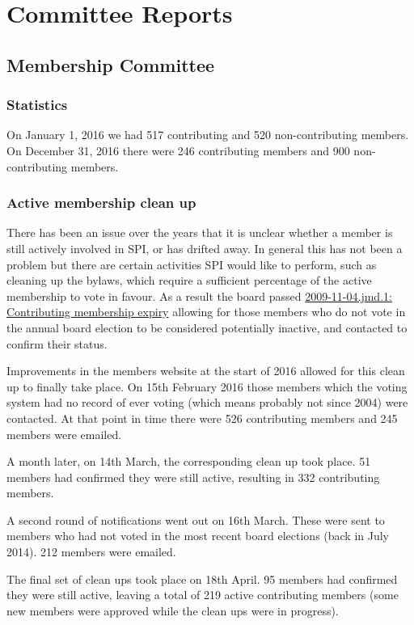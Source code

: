 \documentclass[letterpaper]{report}
\begin{document}
\chapter{Committee Reports}
\section{Membership Committee}

\subsection{Statistics}

On January 1, 2016 we had 517 contributing and 520 non-contributing members.
On December 31, 2016 there were 246 contributing members and 900 non-contributing
members.

\subsection{Active membership clean up}

There has been an issue over the years that it is unclear whether a member is still actively involved in SPI, or has drifted away. In general this has not been a problem but there are certain activities SPI would like to perform, such as cleaning up the bylaws, which require a sufficient percentage of the active membership to vote in favour. As a result the board passed \href{https://spi-inc.org/corporate/resolutions/2009/2009-11-04.jmd.1/}{2009-11-04.jmd.1: Contributing membership expiry} allowing for those members who do not vote in the annual board election to be considered potentially inactive, and contacted to confirm their status.

Improvements in the members website at the start of 2016 allowed for this clean up to finally take place. On 15th February 2016 those members which the voting system had no record of ever voting (which means probably not since 2004) were contacted. At that point in time there were 526 contributing members and 245 members were emailed.

A month later, on 14th March, the corresponding clean up took place. 51 members had confirmed they were still active, resulting in 332 contributing members.

A second round of notifications went out on 16th March. These were sent to members who had not voted in the most recent board elections (back in July 2014). 212 members were emailed.

The final set of clean ups took place on 18th April. 95 members had confirmed they were still active, leaving a total of 219 active contributing members (some new members were approved while the clean ups were in progress).
\end{document}
